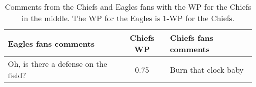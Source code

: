 \begin{table}[t]
    \centering
    \begin{tabular}{lcl}
        \toprule
        \textbf{Eagles fans comments} & \textbf{Chiefs WP} & \textbf{Chiefs fans comments} \\ \midrule
        Oh, is there a defense on the field? & 0.75 & Burn that clock baby \\ \bottomrule
    \end{tabular}
    \caption{Comments from the Chiefs and Eagles fans with the WP for the Chiefs in the middle. The WP for the Eagles is 1-WP for the Chiefs.}
    \label{tab:football-exs}
\end{table}
